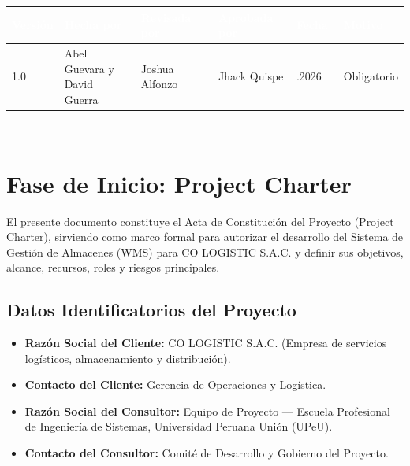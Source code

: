 \documentclass[11pt]{article}
\newcounter{none} %
\begin{document}
\vspace{0.3cm}
\setlength{\tabcolsep}{5pt}
\renewcommand{\arraystretch}{1.5}
{\def\LTcaptype{none}
\begin{longtable}[]{@{}
  >{\centering\arraybackslash}p{0.12\linewidth}
  >{\raggedright\arraybackslash}p{0.20\linewidth}
  >{\raggedright\arraybackslash}p{0.20\linewidth}
  >{\raggedright\arraybackslash}p{0.20\linewidth}
  >{\centering\arraybackslash}p{0.12\linewidth}
  >{\raggedright\arraybackslash}p{0.16\linewidth}@{}}
\rowcolor{DeepNavy}
\textcolor{white}{\textbf{Versión}} & \textcolor{white}{\textbf{Hecha por}} & \textcolor{white}{\textbf{Revisada por}} & \textcolor{white}{\textbf{Aprobada por}} & \textcolor{white}{\textbf{Fecha}} & \textcolor{white}{\textbf{Motivo}} \\ \hline
\endhead
\rowcolor{LightGray}
1.0 & Abel Guevara y David Guerra & Joshua Alfonzo & Jhack Quispe & 12.05.2026 & Obligatorio \\ \hline
\end{longtable}
}

---

\section{Fase de Inicio: Project Charter}

El presente documento constituye el Acta de Constitución del Proyecto (Project Charter), sirviendo como marco formal para autorizar el desarrollo del Sistema de Gestión de Almacenes (WMS) para CO LOGISTIC S.A.C. y definir sus objetivos, alcance, recursos, roles y riesgos principales.

\subsection{Datos Identificatorios del Proyecto}
\begin{itemize}[label=\textbullet]
  \item \textbf{Razón Social del Cliente:} CO LOGISTIC S.A.C. (Empresa de servicios logísticos, almacenamiento y distribución).
  \item \textbf{Contacto del Cliente:} Gerencia de Operaciones y Logística.
  \item \textbf{Razón Social del Consultor:} Equipo de Proyecto --- Escuela Profesional de Ingeniería de Sistemas, Universidad Peruana Unión (UPeU).
  \item \textbf{Contacto del Consultor:} Comité de Desarrollo y Gobierno del Proyecto.
\end{itemize}
\end{document}
